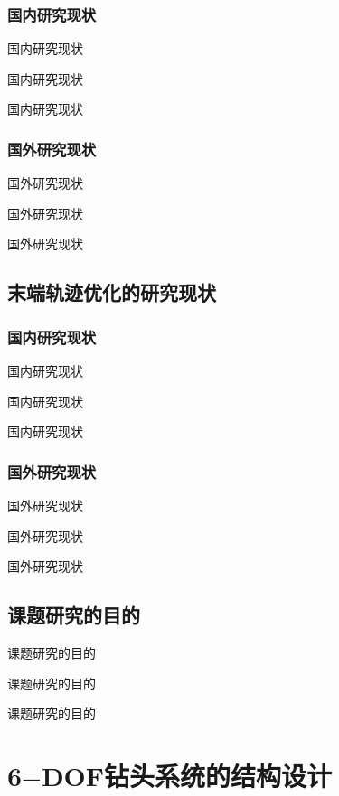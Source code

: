 \documentclass[UTF8]{article}%
\newcommand{\n}{\par}%
\begin{document}
\begin{spacing}{1.5}
		\subsubsection{国内研究现状}
		国内研究现状\n
		国内研究现状\n
		国内研究现状\n
		\subsubsection{国外研究现状}
		国外研究现状\n
		国外研究现状\n
		国外研究现状\n
	\subsection{末端轨迹优化的研究现状}
		\subsubsection{国内研究现状}
		国内研究现状\n
		国内研究现状\n
		国内研究现状\n
		\subsubsection{国外研究现状}
		国外研究现状\n
		国外研究现状\n
		国外研究现状\n
	\subsection{课题研究的目的}
	课题研究的目的\n
	课题研究的目的\n
	课题研究的目的\n
\clearpage
\section{6$-$DOF钻头系统的结构设计}

\end{spacing}
\end{document}
